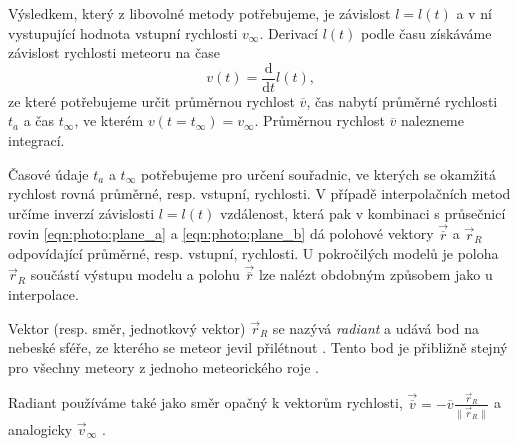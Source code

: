 Výsledkem, který z libovolné metody potřebujeme, je závislost $l=l(t)$ a v ní vystupující hodnota vstupní rychlosti $v_\infty$. Derivací $l(t)$ podle času získáváme závislost rychlosti meteoru na čase
$$
    v(t)=\frac{\text{d}}{\text{d}t}l(t)\text{,}
$$
ze které potřebujeme určit průměrnou rychlost $\overline{v}$, čas nabytí průměrné rychlosti $t_a$ a čas $t_\infty$, ve kterém $v(t\! =\!t_\infty)=v_\infty$. Průměrnou rychlost $\overline{v}$ nalezneme integrací.

Časové údaje $t_a$ a $t_\infty$ potřebujeme pro určení souřadnic, ve kterých se okamžitá rychlost rovná průměrné, resp. vstupní, rychlosti. V případě interpolačních metod určíme inverzí závislosti $l=l(t)$ vzdálenost, která pak v kombinaci s průsečnicí rovin \eqref{eqn:photo:plane_a} a \eqref{eqn:photo:plane_b} dá polohové vektory $\vec{\overline{r}}$ a $\vec{r}_R$ odpovídající průměrné, resp. vstupní, rychlosti. U pokročilých modelů je poloha $\vec{r}_R$ součástí výstupu modelu \cite{singlebodymeteor} a polohu $\vec{\overline{r}}$ lze nalézt obdobným způsobem jako u interpolace.

\smallskip

Vektor (resp. směr, jednotkový vektor) $\vec{r}_R$ se nazývá \textit{radiant} a udává bod na nebeské sféře, ze kterého se meteor jevil přilétnout \cite{ceplecha}\cite{glossary}. Tento bod je přibližně stejný pro všechny meteory z jednoho meteorického roje \cite{glossary}.

Radiant používáme také jako směr opačný k vektorům rychlosti, $\vec{\overline{v}}=-\overline{v}\frac{\vec{r}_R}{\lVert\vec{r}_R\rVert}$ a analogicky $\vec{v}_\infty$ \cite{ceplecha}.

\medskip

